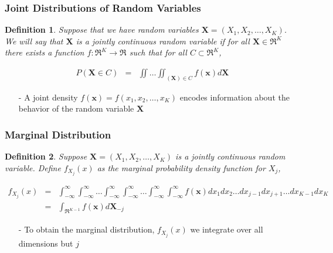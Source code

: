 \documentclass{beamer}
\newtheorem{defn}{Definition}
\numberwithin{equation}{section}
\begin{document}
\begin{frame}
\frametitle{Joint Distributions of Random Variables}

\begin{defn}
Suppose that we have random variables $\boldsymbol{X} = (X_{1}, X_{2}, \hdots, X_{K})$.  We will say that $\boldsymbol{X}$ is a jointly continuous random variable if for all $\boldsymbol{X} \in \Re^{K}$ there exists a function $f:\Re^{K} \rightarrow \Re$ such that for all $C \subset \Re^{K}$, 

\begin{eqnarray}
P\left( \boldsymbol{X} \in C \right) &= &\iint \hdots \iint_{(\boldsymbol{X}) \in C } f(\boldsymbol{x}) d\boldsymbol{X} \nonumber 
\end{eqnarray}


\end{defn}


\begin{itemize}
\item[-] A joint density $f(\boldsymbol{x})= f(x_{1}, x_{2}, \hdots, x_{K} ) $ encodes information about the behavior of the random variable $\boldsymbol{X}$
\end{itemize}


\end{frame}


\begin{frame}
\frametitle{Marginal Distribution}

\footnotesize
\begin{defn}
Suppose $\boldsymbol{X} = (X_{1}, X_{2}, \hdots, X_{K})$ is a jointly continuous random variable.  Define $f_{X_{j}}(x)$ as the \alert{marginal} probability density function for $X_{j}$, 

\begin{eqnarray}
f_{X_{j}}(x) & = & \int_{-\infty}^{\infty}\int_{-\infty}^{\infty} \hdots \int_{-\infty}^{\infty}\int_{-\infty}^{\infty} \hdots \int_{-\infty}^{\infty} \int_{-\infty}^{\infty} f(\boldsymbol{x}) dx_{1}dx_{2}\hdots dx_{j-1} dx_{j+1}\hdots dx_{K-1} dx_{K} \nonumber \\
& = & \int_{\Re^{K-1} } f(\boldsymbol{x}) d\boldsymbol{X}_{-j} \nonumber 
\end{eqnarray} 


\end{defn}

\begin{itemize}
\item[-] To obtain the marginal distribution, $f_{X_{j}}(x)$ we integrate over all dimensions but $j$   
\end{itemize}


\end{frame}
\end{document}
